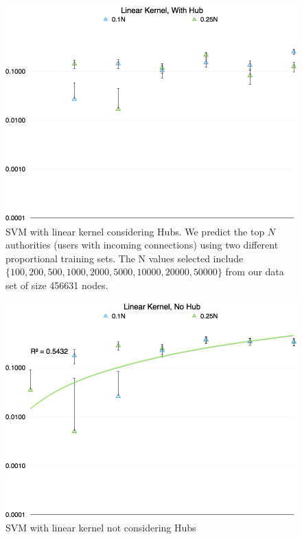 \documentclass{sig-alternate-10pt}
\begin{document}
\begin{figure}
\begin{center}
\includegraphics[width=\columnwidth]{img/linear_hub}
\caption{SVM with linear kernel considering Hubs.  We predict the top $N$ authorities (users with incoming connections) using two different proportional training sets.  The N values selected include $\{100, 200, 500, 1000, 2000, 5000, 10000, 20000, 50000\}$ from our data set of size 456631 nodes.}
\label{linear_hub}
\end{center}
\end{figure}

\begin{figure}
\begin{center}
\includegraphics[width=\columnwidth]{img/linear_no_hub}
\caption{SVM with linear kernel not considering Hubs}
\label{linear_no_hub}
\end{center}
\end{figure}
\end{document}
